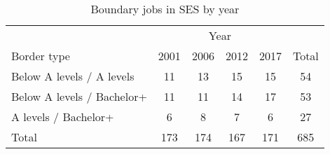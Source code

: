 \begin{table}
	\caption{Boundary jobs in SES by year}
	\label{tab:sesBorderJobs}
	\centering
	\begin{tabular}{lccccc}
	
\toprule
& \multicolumn{4}{c}{Year}\\
Border type & 2001 & 2006 & 2012 & 2017 & Total \\
\midrule
Below A levels / A levels&11&13&15&15&54 \\
Below A levels / Bachelor+&11&11&14&17&53 \\
A levels / Bachelor+&6&8&7&6&27 \\
\vspace{0cm}
\vspace{0cm}
\midrule
\midrule
Total&173&174&167&171&685 \\
\bottomrule
\end{tabular}
\end{table}
